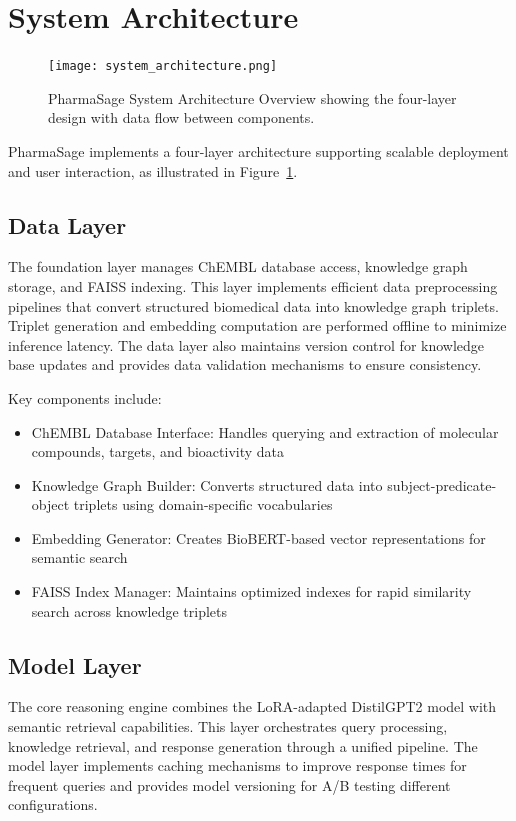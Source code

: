 \documentclass[conference]{IEEEtran}
\begin{document}
\section{System Architecture}

\begin{figure}[h]
\centering
\texttt{[image: system\_architecture.png]}
\caption{PharmaSage System Architecture Overview showing the four-layer design with data flow between components.}
\label{fig:architecture}
\end{figure}

PharmaSage implements a four-layer architecture supporting scalable deployment and user interaction, as illustrated in Figure~\ref{fig:architecture}.

\subsection{Data Layer}
The foundation layer manages ChEMBL database access, knowledge graph storage, and FAISS indexing. This layer implements efficient data preprocessing pipelines that convert structured biomedical data into knowledge graph triplets. Triplet generation and embedding computation are performed offline to minimize inference latency. The data layer also maintains version control for knowledge base updates and provides data validation mechanisms to ensure consistency.

Key components include:
\begin{itemize}
\item ChEMBL Database Interface: Handles querying and extraction of molecular compounds, targets, and bioactivity data
\item Knowledge Graph Builder: Converts structured data into subject-predicate-object triplets using domain-specific vocabularies
\item Embedding Generator: Creates BioBERT-based vector representations for semantic search
\item FAISS Index Manager: Maintains optimized indexes for rapid similarity search across knowledge triplets
\end{itemize}

\subsection{Model Layer}
The core reasoning engine combines the LoRA-adapted DistilGPT2 model with semantic retrieval capabilities. This layer orchestrates query processing, knowledge retrieval, and response generation through a unified pipeline. The model layer implements caching mechanisms to improve response times for frequent queries and provides model versioning for A/B testing different configurations.
\end{document}
